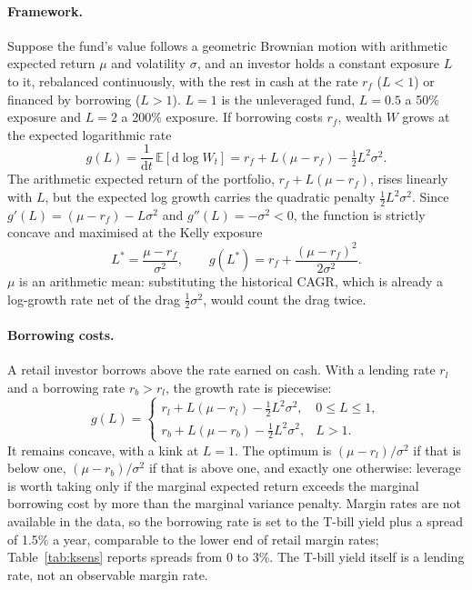 \documentclass[11pt,a4paper]{article}
\begin{document}
\paragraph{Framework.} Suppose the fund's value follows a geometric Brownian motion with arithmetic expected return $\mu$ and volatility $\sigma$, and an investor holds a constant exposure $L$ to it, rebalanced continuously, with the rest in cash at the rate $r_f$ ($L<1$) or financed by borrowing ($L>1$). $L=1$ is the unleveraged fund, $L=0.5$ a 50\% exposure and $L=2$ a 200\% exposure. If borrowing costs $r_f$, wealth $W$ grows at the expected logarithmic rate
\[
g(L) = \frac{1}{\mathrm{d}t}\,\mathbb{E}\left[\mathrm{d}\log W_t\right] = r_f + L(\mu - r_f) - \tfrac{1}{2}L^2\sigma^2 .
\]
The arithmetic expected return of the portfolio, $r_f + L(\mu - r_f)$, rises linearly with $L$, but the expected log growth carries the quadratic penalty $\tfrac{1}{2}L^2\sigma^2$. Since $g'(L) = (\mu - r_f) - L\sigma^2$ and $g''(L) = -\sigma^2 < 0$, the function is strictly concave and maximised at the Kelly exposure \citep{kelly1956,breiman1961,merton1969}
\[
L^* = \frac{\mu - r_f}{\sigma^2}, \qquad g(L^*) = r_f + \frac{(\mu - r_f)^2}{2\sigma^2}.
\]
$\mu$ is an arithmetic mean: substituting the historical CAGR, which is already a log-growth rate net of the drag $\tfrac12\sigma^2$, would count the drag twice.

\paragraph{Borrowing costs.} A retail investor borrows above the rate earned on cash. With a lending rate $r_l$ and a borrowing rate $r_b > r_l$, the growth rate is piecewise:
\[
g(L) = \begin{cases} r_l + L(\mu - r_l) - \tfrac12 L^2\sigma^2, & 0 \le L \le 1,\\[2pt] r_b + L(\mu - r_b) - \tfrac12 L^2\sigma^2, & L > 1. \end{cases}
\]
It remains concave, with a kink at $L=1$. The optimum is $(\mu - r_l)/\sigma^2$ if that is below one, $(\mu - r_b)/\sigma^2$ if that is above one, and exactly one otherwise: leverage is worth taking only if the marginal expected return exceeds the marginal borrowing cost by more than the marginal variance penalty. Margin rates are not available in the data, so the borrowing rate is set to the T-bill yield plus a spread of 1.5\% a year, comparable to the lower end of retail margin rates; Table~\ref{tab:ksens} reports spreads from 0 to 3\%. The T-bill yield itself is a lending rate, not an observable margin rate.
\end{document}
